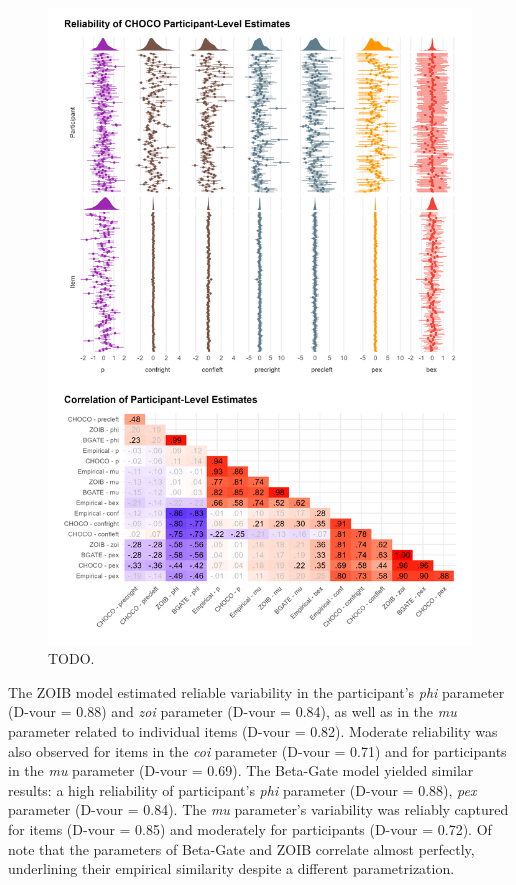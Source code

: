 \documentclass[
  jou,
  floatsintext,
  longtable,
  nolmodern,
  notxfonts,
  notimes,
  colorlinks=true,linkcolor=blue,citecolor=blue,urlcolor=blue]{apa7}
\begin{document}
\begin{figure}[!htbp]

{\caption{{TODO.}{\label{fig-four}}}}

\includegraphics[width=1\textwidth,height=\textheight]{./figures/fig4.png}

\end{figure}

The ZOIB model estimated reliable variability in the participant's
\emph{phi} parameter (D-vour = 0.88) and \emph{zoi} parameter (D-vour =
0.84), as well as in the \emph{mu} parameter related to individual items
(D-vour = 0.82). Moderate reliability was also observed for items in the
\emph{coi} parameter (D-vour = 0.71) and for participants in the
\emph{mu} parameter (D-vour = 0.69). The Beta-Gate model yielded similar
results: a high reliability of participant's \emph{phi} parameter
(D-vour = 0.88), \emph{pex} parameter (D-vour = 0.84). The \emph{mu}
parameter's variability was reliably captured for items (D-vour = 0.85)
and moderately for participants (D-vour = 0.72). Of note that the
parameters of Beta-Gate and ZOIB correlate almost perfectly, underlining
their empirical similarity despite a different parametrization.
\end{document}
